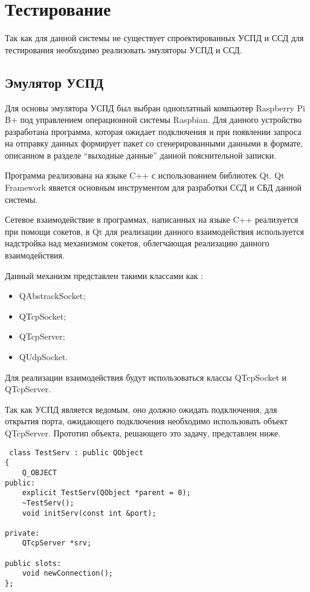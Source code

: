 \newpage
\section{Тестирование}
\setcounter{figure}{0}

Так как для данной системы не существует спроектированных УСПД и ССД для тестирования необходимо реализовать эмуляторы УСПД и ССД. 

\subsection{Эмулятор УСПД}

Для основы эмулятора УСПД был выбран одноплатный компьютер Raspberry Pi B+ под управлением операционной системы Raspbian. Для данного устройство разработана программа, которая ожидает подключения и при появлении запроса на отправку данных формирует пакет со сгенерированными данными в формате, описанном в разделе ``выходные данные'' данной пояснительной записки.

Программа реализована на языке C++ с использованием библиотек Qt. Qt Framework явяется основным инструментом для разработки ССД и СБД данной системы.

Сетевое взаимодействие в программах, написанных на языке C++ реализуется при помощи сокетов, в Qt для реализации данного взаимодействия используется надстройка над механизмом сокетов, облегчающая реализацию данного взаимодействия.

Данный механизм представлен такими классами как \cite{qt}:
\begin{itemize}
 \item QAbstrackSocket;
 \item QTcpSocket;
 \item QTcpServer;
 \item QUdpSocket.
\end{itemize}

Для реализации взаимодействия будут использоваться классы QTcpSocket и QTcpServer.

Так как УСПД является ведомым, оно должно ожидать подключения, для открытия порта, ожидающего подключения необходимо использовать объект QTcpServer. Прототип объекта, решающего это задачу, представлен ниже.

\begin{lstlisting}
 class TestServ : public QObject
{
    Q_OBJECT
public:
    explicit TestServ(QObject *parent = 0);
    ~TestServ();
    void initServ(const int &port);

private:
    QTcpServer *srv;

public slots:
    void newConnection();
};
\end{lstlisting}

